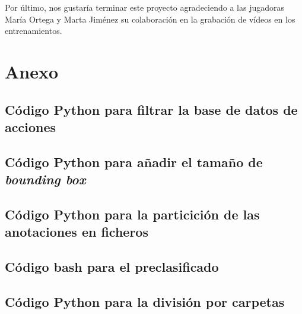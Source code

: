 \documentclass[12pt]{report} %
\begin{document}
    Por último, nos gustaría terminar este proyecto agradeciendo a las jugadoras María Ortega y Marta Jiménez su colaboración en la grabación de vídeos en los entrenamientos.



    \clearpage

    \label{chap:bibliography}
    \printbibliography


    \chapter*{Anexo}
    \label{anexo}

    \section*{Código Python para filtrar la base de datos de acciones}
    \label{filtrado_script}
    

    \section*{Código Python para añadir el tamaño de \textit{bounding box}}
    \label{mod_ball}
    

    \section*{Código Python para la particición de las anotaciones en ficheros}
    

    \section*{Código bash para el preclasificado}
    \label{preclasificado}
    

    \section*{Código Python para la división por carpetas}
    \label{div_carpetas}
    
\end{document}
